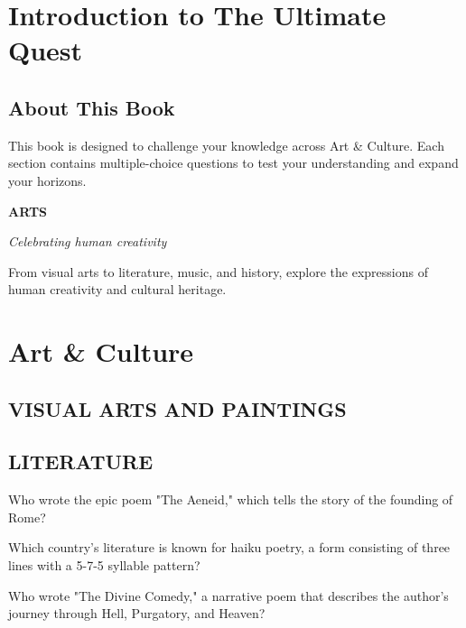\documentclass[12pt,a4paper]{book}
\renewcommand{\sectioncover}[3]{%
  \cleardoublepage
  \thispagestyle{empty}
  \begin{center}
    \vspace*{2cm}
    {\huge\bfseries\textcolor{questblue}{#1}\par}
    \vspace{0.7cm}
    {\Large\textit{#2}\par}
    \vspace{1.2cm}
    \begin{tcolorbox}[
      enhanced,
      colback=white,
      colframe=questorange,
      arc=5mm,
      boxrule=0.5mm,
      width=0.7\textwidth,
      halign=center,
      valign=center,
      height=5cm
    ]
      \begin{center}
        {\large #3\par}
      \end{center}
    \end{tcolorbox}
    \vspace{1.5cm}
  \end{center}
  \cleardoublepage
}
\begin{document}
\frontmatter

\tableofcontents

\mainmatter

\chapter{Introduction to The Ultimate Quest}
\section{About This Book}
This book is designed to challenge your knowledge across Art & Culture. Each section contains multiple-choice questions to test your understanding and expand your horizons.

\sectioncover{ARTS}{Celebrating human creativity}{From visual arts to literature, music, and history, explore the expressions of human creativity and cultural heritage.}

\chapter{Art & Culture}
\section{VISUAL ARTS AND PAINTINGS}


\section{LITERATURE}

\begin{enhancedmcq}[Question 1]{Who wrote the epic poem "The Aeneid," which tells the story of the founding of Rome?}
\end{enhancedmcq}

\begin{enhancedmcq}[Question 2]{Which country's literature is known for haiku poetry, a form consisting of three lines with a 5-7-5 syllable pattern?}
\end{enhancedmcq}

\begin{enhancedmcq}[Question 3]{Who wrote "The Divine Comedy," a narrative poem that describes the author's journey through Hell, Purgatory, and Heaven?}
\end{enhancedmcq}
\end{document}
